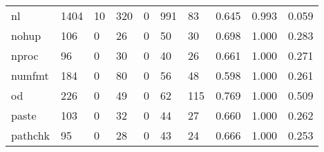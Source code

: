 \begin{longtable}{lp{2.0cm}p{2.0cm}p{2.0cm}p{2.0cm}p{2.0cm}p{2.0cm}p{2.0cm}p{2.0cm}p{2.0cm}}
nl        &                   1404 &                                 10 &                               320 &                                0 &                               991 &                              83 &                                0.645 &                                  0.993 &                                0.059 \\
nohup     &                    106 &                                  0 &                                26 &                                0 &                                50 &                              30 &                                0.698 &                                  1.000 &                                0.283 \\
nproc     &                     96 &                                  0 &                                30 &                                0 &                                40 &                              26 &                                0.661 &                                  1.000 &                                0.271 \\
numfmt    &                    184 &                                  0 &                                80 &                                0 &                                56 &                              48 &                                0.598 &                                  1.000 &                                0.261 \\
od        &                    226 &                                  0 &                                49 &                                0 &                                62 &                             115 &                                0.769 &                                  1.000 &                                0.509 \\
paste     &                    103 &                                  0 &                                32 &                                0 &                                44 &                              27 &                                0.660 &                                  1.000 &                                0.262 \\
pathchk   &                     95 &                                  0 &                                28 &                                0 &                                43 &                              24 &                                0.666 &                                  1.000 &                                0.253 \\

\end{longtable}
